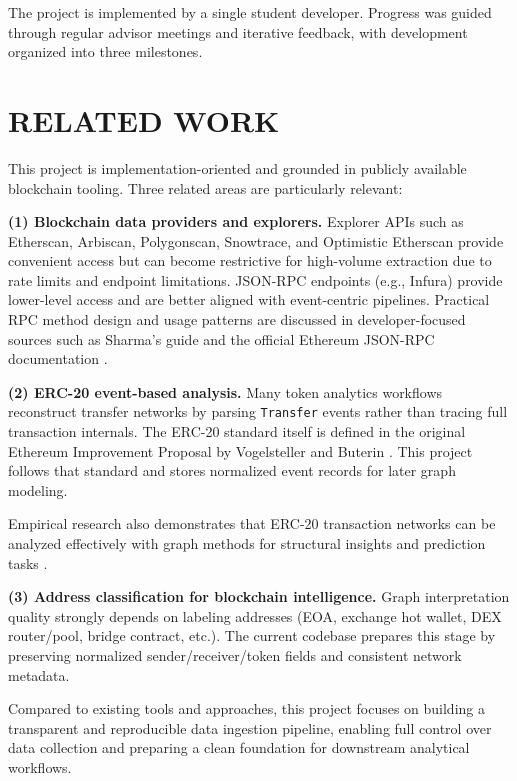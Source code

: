 \documentclass[a4paper,12pt]{report}
\begin{document}
The project is implemented by a single student developer. Progress was guided through regular advisor meetings and iterative feedback, with development organized into three milestones.


\chapter{RELATED WORK}

This project is implementation-oriented and grounded in publicly available blockchain tooling.
Three related areas are particularly relevant:

\textbf{(1) Blockchain data providers and explorers.}  
Explorer APIs such as Etherscan, Arbiscan, Polygonscan, Snowtrace, and Optimistic Etherscan 
\cite{etherscan_docs, arbiscan, polygonscan, snowtrace, optimistic_etherscan} provide convenient
access but can become restrictive for high-volume extraction due to rate limits and endpoint
limitations. JSON-RPC endpoints (e.g., Infura) provide lower-level access and are better aligned with
event-centric pipelines. Practical RPC method design and usage patterns are discussed in
developer-focused sources such as Sharma's guide \cite{sharma2020} and the official Ethereum
JSON-RPC documentation \cite{ethereum_jsonrpc}.

\textbf{(2) ERC-20 event-based analysis.}  
Many token analytics workflows reconstruct transfer networks by parsing \texttt{Transfer} events rather
than tracing full transaction internals. The ERC-20 standard itself is defined in the original Ethereum
Improvement Proposal by Vogelsteller and Buterin \cite{erc20}. This project follows that standard and
stores normalized event records for later graph modeling.

Empirical research also demonstrates that ERC-20 transaction networks can be analyzed effectively
with graph methods for structural insights and prediction tasks \cite{somin2020}.

\textbf{(3) Address classification for blockchain intelligence.}  
Graph interpretation quality strongly depends on labeling addresses (EOA, exchange hot wallet,
DEX router/pool, bridge contract, etc.). The current codebase prepares this stage by preserving
normalized sender/receiver/token fields and consistent network metadata.

Compared to existing tools and approaches, this project focuses on building a transparent and 
reproducible data ingestion pipeline, enabling full control over data collection and preparing 
a clean foundation for downstream analytical workflows.
\end{document}
